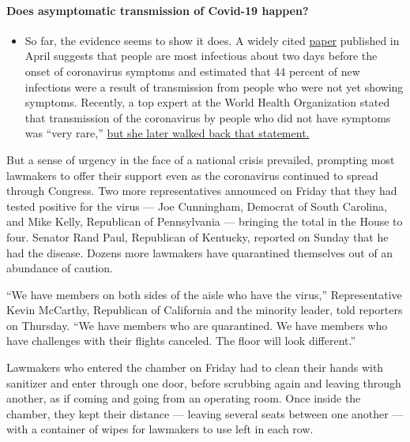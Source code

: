\begin{itemize}
{  \paragraph{Does asymptomatic transmission of Covid-19
  happen?}\label{does-asymptomatic-transmission-of-covid-19-happen}}

  \begin{itemize}
  \tightlist
  \item
    So far, the evidence seems to show it does. A widely cited
    \href{https://www.nature.com/articles/s41591-020-0869-5}{paper}
    published in April suggests that people are most infectious about
    two days before the onset of coronavirus symptoms and estimated that
    44 percent of new infections were a result of transmission from
    people who were not yet showing symptoms. Recently, a top expert at
    the World Health Organization stated that transmission of the
    coronavirus by people who did not have symptoms was ``very rare,''
    \href{https://www.nytimes.com/2020/06/09/world/coronavirus-updates.html?action=click\&pgtype=Article\&state=default\&region=MAIN_CONTENT_3\&context=storylines_faq\#link-1f302e21}{but
    she later walked back that statement.}
  \end{itemize}
\end{itemize}

But a sense of urgency in the face of a national crisis prevailed,
prompting most lawmakers to offer their support even as the coronavirus
continued to spread through Congress. Two more representatives announced
on Friday that they had tested positive for the virus --- Joe
Cunningham, Democrat of South Carolina, and Mike Kelly, Republican of
Pennsylvania --- bringing the total in the House to four. Senator Rand
Paul, Republican of Kentucky, reported on Sunday that he had the
disease. Dozens more lawmakers have quarantined themselves out of an
abundance of caution.

``We have members on both sides of the aisle who have the virus,''
Representative Kevin McCarthy, Republican of California and the minority
leader, told reporters on Thursday. ``We have members who are
quarantined. We have members who have challenges with their flights
canceled. The floor will look different.''

Lawmakers who entered the chamber on Friday had to clean their hands
with sanitizer and enter through one door, before scrubbing again and
leaving through another, as if coming and going from an operating room.
Once inside the chamber, they kept their distance --- leaving several
seats between one another --- with a container of wipes for lawmakers to
use left in each row.

